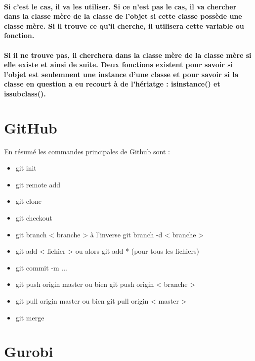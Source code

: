 \documentclass[a4paper, 12pt, twoside]{article}
\begin{document}
\paragraph{ Si c’est le cas, il va les utiliser. Si ce n’est pas le cas, il va chercher dans la classe mère de la classe de l’objet si cette classe possède une classe mère. Si il trouve ce qu’il cherche, il utilisera cette variable ou fonction.}
\paragraph{Si il ne trouve pas, il cherchera dans la classe mère de la classe mère si elle existe et ainsi de suite. Deux fonctions existent pour savoir si l'objet est seulemnent  une instance d'une classe et pour savoir si la classe en question a eu recourt à de l'hériatge : isinstance() et issubclass(). }
\section{GitHub}
En résumé les commandes principales de Github sont : 
\begin{itemize}
\item  git init 
\item git remote add 
\item  git clone 
\item  git checkout 
\item git branch < branche > à l'inverse  git branch -d < branche > 
\item git add < fichier > ou alors  git add * (pour tous les fichiers) 
\item  git commit -m ... 
\item  git push origin master ou bien  git push origin < branche > 
\item  git pull origin master   ou bien git pull origin < master > 
\item  git merge 
\end{itemize}
\section{Gurobi}
\newpage
\end{document}
